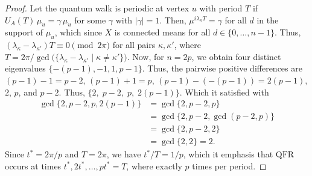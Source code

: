 \documentclass[12pt]{amsart}
\newcommand{\QFR}{\mathrm{QFR}}
\begin{document}
\begin{proof}
Let the quantum walk is periodic at vertex $u$ with period $T$ if
  $U_A(T)\,\mu_u = \gamma\, \mu_u$ for some $\gamma$ with $|\gamma| = 1$. Then, 
  $\mu^{i\lambda_{\kappa} T} = \gamma$ for all $d$ in the support of $\mu_u$, which since
  $X$ is connected means for all $d \in \{0, \ldots, n-1\}$.
Thus,  $(\lambda_{\kappa}-\lambda_{\kappa'})T \equiv 0 \pmod{2\pi}$ for all pairs
  $\kappa, \kappa'$, where $T = 2\pi / \gcd\bigl(\{\lambda_{\kappa} - \lambda_{\kappa'} \mid  \kappa \neq \kappa'\}\bigr)$. Now, for $n=2p$, we obtain four distinct eigenvalues
  $\{-(p-1), -1, 1, p-1\}$. Thus, the pairwise positive differences are $(p-1) - 1 = p-2$, $ (p-1)+1=p$, $(p-1) - (-(p-1)) = 2(p-1)$, $2$, $p$, and  $p-2$.
 Thus,  $\{2,\; p-2,\; p,\; 2(p-1)\}$. Which it satisfied with 
  \begin{align*}
    \gcd\{2, p-2, p, 2(p-1)\}
    &= \gcd\{2, p-2, p\} \\
    &= \gcd\{2, p - 2, \gcd(p-2, p)\} \\
    &= \gcd\{2, p-2, 2\} \\
    &= \gcd\{2, 2\} = 2. 
  \end{align*}
Since $t^* = 2\pi/p$ and $T = 2\pi$, we have $t^*/T = 1/p$, which it emphasis that $\QFR$ occurs
  at times $t^*, 2t^*, \ldots, pt^* = T$, where exactly $p$ times per period.
\end{proof}
\end{document}

